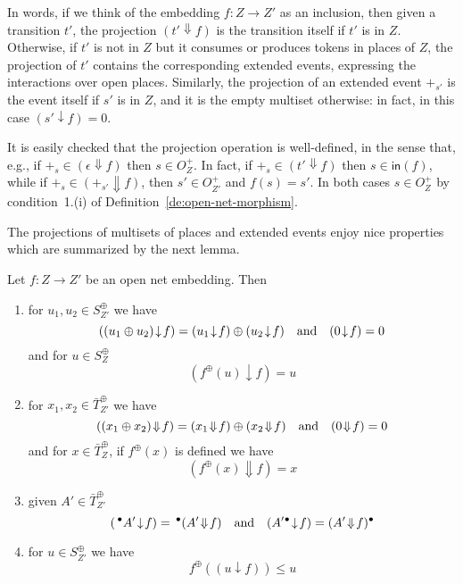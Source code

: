\documentclass{LMCS}
\newcommand{\inp}[1]{\ensuremath{\mathsf{in}({#1})}}
\newcommand{\mon}[1]{\ensuremath{{#1}^\oplus}}
\newcommand{\monSub}[2]{\ensuremath{{#1}_{#2}^\oplus}}
\newcommand{\res}[2]{\ensuremath{({#1}\!\downarrow\!{#2})}}
\newcommand{\sres}[2]{\ensuremath{({#1}\!\Downarrow\!{#2})}}
\newcommand{\pre}[1][(\cdot)]{\ensuremath{\!~^\bullet{#1}}}
\newcommand{\post}[1][(\cdot)]{\ensuremath{{#1} {^\bullet}}}
\begin{document}
In words, if we think of the embedding $f : Z \to Z'$ as an inclusion,
then given a transition $t'$, the projection $\sres{t'}{f}$ is the
transition itself if $t'$ is in $Z$. Otherwise, if $t'$ is not in $Z$
but it consumes or produces tokens in places of $Z$, the projection of
$t'$ contains the corresponding extended events, expressing the
interactions over open places.
Similarly, the projection of an extended event $+_{s'}$ is
the event itself if $s'$ is in $Z$, and it is the empty multiset
otherwise: in fact, in this case $\res{s'}{f} = 0$.

It is easily checked that the projection operation is
well-defined, in the sense that, e.g., if $+_s \in \sres{\epsilon}{f}$
then $s \in O_Z^+$. In fact, if $+_s \in \sres{t'}{f}$ then $s \in
\inp{f}$, while if $+_s \in \sres{+_{s'}}{f}$, then $s' \in O_{Z'}^+$
and $f(s) = s'$. In both cases $s \in O_{Z}^+$ by condition~1.(i) of
Definition~\ref{de:open-net-morphism}.

 
The projections of multisets of places and extended events enjoy nice
properties which are summarized by the next lemma.

\begin{lem}
  \label{le:proj-prop}
  Let $f : Z \to Z'$ be an open net embedding. Then
  
  \begin{enumerate}[\em(1)]

  \item for $u_1, u_2 \in \monSub{S}{{Z'}}$ we have
    \[\res{(u_1 \oplus u_2)}{f} = \res{u_1}{f} \oplus  \res{u_2}{f}
      \quad\hbox{and}\quad
      \res{0}{f} = 0
    \]
    and for $u \in \monSub{S}{{Z}}$ 
    \[\res{\mon{f}(u)}{f} = u\]
    
  \item for $x_1, x_2 \in \monSub{\bar{T}}{{Z'}}$ we have
    \[\sres{(x_1 \oplus x_2)}{f} = \sres{x_1}{f} \oplus  \sres{x_2}{f}
      \quad\hbox{and}\quad
      \sres{0}{f} = 0
    \]
    and for $x \in \monSub{\bar{T}}{{Z}}$, 
    if $\mon{f}(x)$ is defined we have
    \[\sres{\mon{f}(x)}{f} = x\] 

  \item given $A' \in \monSub{\bar{T}}{{Z'}}$
    \[\res{\pre[A']}{f} =  \pre[\sres{A'}{f}]
      \quad\hbox{and}\quad
      \res{\post[A']}{f} =  \post[\sres{A'}{f}]
    \]

  \item for $u \in \monSub{S}{{Z'}}$ we have 
    \[\mon{f}(\res{u}{f}) \leq u\]
  \end{enumerate}
\end{lem}
\end{document}
